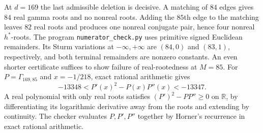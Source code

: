 At $d=169$ the last admissible deletion is decisive. A matching of $84$
edges gives $84$ real gamma roots and no nonreal roots. Adding the
$85$th edge to the matching leaves $82$ real roots and produces one
nonreal conjugate pair, hence four nonreal $h^*$-roots. The program
\texttt{numerator\_check.py} uses primitive signed Euclidean
remainders. Its Sturm variations at $-\infty,+\infty$ are $(84,0)$
and $(83,1)$, respectively, and both terminal remainders are nonzero
constants. An even shorter certificate suffices to show failure of
real-rootedness at $M=85$. For $P=\Gamma_{169,85}$ and
$x=-1/218$, exact rational arithmetic gives
\[
 -13348 < P'(x)^2-P(x)P''(x) < -13347.
\]
A real polynomial with only real roots satisfies
$(P')^2-PP''\ge0$ on $\mathbb R$, by differentiating its logarithmic
derivative away from the roots and extending by continuity. The checker evaluates $P,P',P''$ together by Horner's recurrence in
exact rational arithmetic.
